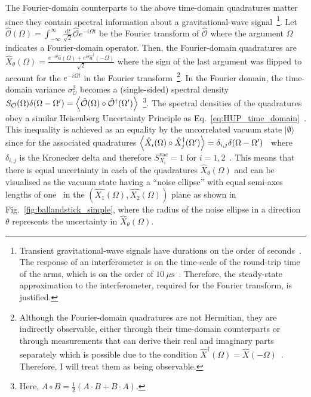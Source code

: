 The Fourier-domain counterparts to the above time-domain quadratures matter since they contain spectral information about a gravitational-wave signal~\footnote{Transient gravitational-wave signals have durations on the order of seconds~\cite{}. The response of an interferometer is on the time-scale of the round-trip time of the arms, which is on the order of $10~\mu\text{s}$~\cite{}. Therefore, the steady-state approximation to the interferometer, required for the Fourier transform, is justified.}. %
Let $\hat{\mathcal{O}}(\Omega) = \int_{-\infty}^\infty \frac{\mathrm{d}t}{\sqrt{2}} \hat{\mathcal{O}} e^{-i\Omega t}$ be the Fourier transform of $\hat{\mathcal{O}}$ where the argument $\Omega$ indicates a Fourier-domain operator. Then, the Fourier-domain quadratures are $\hat{X}_\theta(\Omega)=\frac{e^{-i \theta}\hat{a}(\Omega)+e^{i \theta}\hat{a}^\dag(-\Omega)}{\sqrt{2}}$ where the sign of the last argument was flipped to account for the $e^{-i\Omega t}$ in the Fourier transform~\footnote{Although the Fourier-domain quadratures are not Hermitian, they are indirectly observable, either through their time-domain counterparts or through measurements that can derive their real and imaginary parts separately which is possible due to the condition $\hat{X}^\dag(\Omega)=\hat{X}(-\Omega)$~\cite{SCHUMAKER1986317}. Therefore, I will treat them as being observable.}.
In the Fourier domain, the time-domain variance $\sigma_\mathcal{O}^2$ becomes a (single-sided) spectral density $S_\mathcal{O}(\Omega)\delta(\Omega-\Omega')=\ev{\hat{\mathcal{O}}(\Omega)\circ\hat{\mathcal{O}}^\dag(\Omega')}$~\footnote{Here, $A\circ B=\frac{1}{2}(A\cdot B+B\cdot A)$.}.
The spectral densities of the quadratures obey a similar Heisenberg Uncertainty Principle as Eq.~\ref{eq:HUP_time_domain}~\cite{}. 
This inequality is achieved as an equality by the uncorrelated vacuum state $\lvert\emptyset\rangle$ since for the associated quadratures $\ev{\hat{X}_i(\Omega)\circ\hat{X}_j^\dag(\Omega')}=\delta_{i,j}\delta(\Omega-\Omega')$~\cite{} where $\delta_{i,j}$ is the Kronecker delta and therefore $S_{X_i}^\text{vac}=1$ for $i=1,2$~\cite{danilishinQuantumMeasurementTheory2012}. This means that there is equal uncertainty in each of the quadratures $\hat{X}_\theta(\Omega)$ and can be visualised as the vacuum state having a ``noise ellipse'' with equal semi-axes lengths of one~\cite{} in the $(\hat{X_1}(\Omega),\hat{X_2}(\Omega))$ plane as shown in Fig.~\ref{fig:ballandstick_simple}, where the radius of the noise ellipse in a direction $\theta$ represents the uncertainty in $\hat{X}_\theta(\Omega)$.

